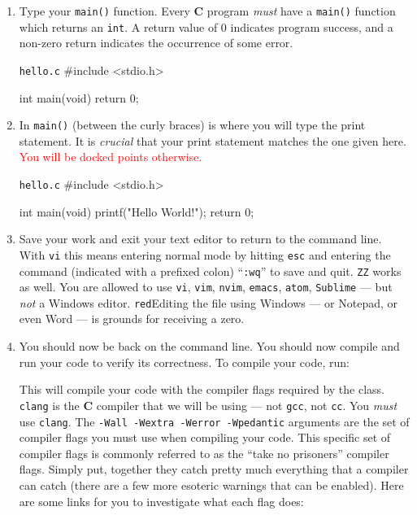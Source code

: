 \begin{enumerate}
  \item Type your \texttt{main()} function. Every \textbf{C} program \emph{must}
    have a \texttt{main()} function which returns an \texttt{int}. A
    return value of 0 indicates program success, and a non-zero return
    indicates the occurrence of some error.

\begin{clisting}{\texttt{hello.c}}
#include <stdio.h>

int main(void) {
    return 0;
}
\end{clisting}

  \item In \texttt{main()} (between the curly braces) is where you will type the
    print statement. It is \emph{crucial} that your print statement matches the
    one given here. \textcolor{red}{You will be docked points otherwise.}

\begin{clisting}{\texttt{hello.c}}
#include <stdio.h>

int main(void) {
    printf("Hello World!\n");
    return 0;
}
\end{clisting}

  \item Save your work and exit your text editor to return to the
    command line. With \texttt{vi} this means entering normal mode by
    hitting \texttt{esc} and entering the command (indicated with a
    prefixed colon) ``\texttt{:wq}'' to save and quit. \texttt{ZZ} works
    as well. You are allowed to use \texttt{vi}, \texttt{vim},
    \texttt{nvim}, \texttt{emacs}, \texttt{atom}, \texttt{Sublime} ---
    but \emph{not} a Windows editor. \texttt{red}{Editing the file using
    Windows --- or Notepad, or even Word --- is grounds for receiving a
    zero.}

  \item You should now be back on the command line. You should now compile and
    run your code to verify its correctness. To compile your code, run:


    This will compile your code with the compiler flags required by the class.
    \texttt{clang} is the \textbf{C} compiler that we will be using --- not
    \texttt{gcc}, not \texttt{cc}. You \emph{must} use \texttt{clang}. The
    \texttt{-Wall -Wextra -Werror -Wpedantic} arguments are the set of compiler
    flags you must use when compiling your code. This specific set of compiler
    flags is commonly referred to as the ``take no prisoners'' compiler flags.
    Simply put, together they catch pretty much everything that a compiler can
    catch (there are a few more esoteric warnings that can be enabled). Here are
    some links for you to investigate what each flag does:


\end{enumerate}
